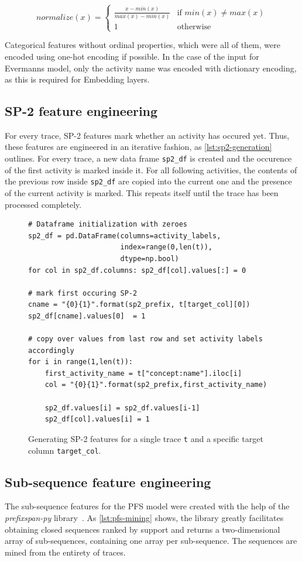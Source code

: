 $$normalize(x) =
\begin{cases}
\frac{x-min(x)}{max(x)-min(x)} & \text{if } min(x) \neq max(x)\\
1 & \text{otherwise}
\end{cases}
$$

Categorical features without ordinal properties, which were all of them, were encoded using one-hot encoding if possible. In the case of the input for Evermanns model, only the activity name was encoded with dictionary encoding, as this is required for Embedding layers.

\subsection*{SP-2 feature engineering}
For every trace, SP-2 features mark whether an activity has occured yet. Thus, these features are engineered in an iterative fashion, as \autoref{lst:sp2-generation} outlines. For every trace, a new data frame \texttt{sp2\_df} is created and the occurence of the first activity is marked inside it. For all following activities, the contents of the previous row inside \texttt{sp2\_df} are copied into the current one and the presence of the current activity is marked. This repeats itself until the trace has been processed completely.

\begin{figure}
\begin{verbatim}
# Dataframe initialization with zeroes
sp2_df = pd.DataFrame(columns=activity_labels,
                      index=range(0,len(t)),
                      dtype=np.bool)
for col in sp2_df.columns: sp2_df[col].values[:] = 0

# mark first occuring SP-2 
cname = "{0}{1}".format(sp2_prefix, t[target_col][0])
sp2_df[cname].values[0]  = 1

# copy over values from last row and set activity labels accordingly
for i in range(1,len(t)):
    first_activity_name = t["concept:name"].iloc[i]
    col = "{0}{1}".format(sp2_prefix,first_activity_name)
    
    sp2_df.values[i] = sp2_df.values[i-1]
    sp2_df[col].values[i] = 1
\end{verbatim}
\caption{Generating SP-2 features for a single trace \texttt{t} and a specific target column \texttt{target\_col}.}
\label{lst:sp2-generation}
\end{figure}

\subsection*{Sub-sequence feature engineering}
The sub-sequence features for the PFS model were created with the help of the \textit{prefixspan-py} library~\cite{web:prefixspan-py}. As \autoref{lst:pfs-mining} shows, the library greatly facilitates obtaining closed sequences ranked by support and returns a two-dimensional array of sub-sequences, containing one array per sub-sequence. The sequences are mined from the entirety of traces.

